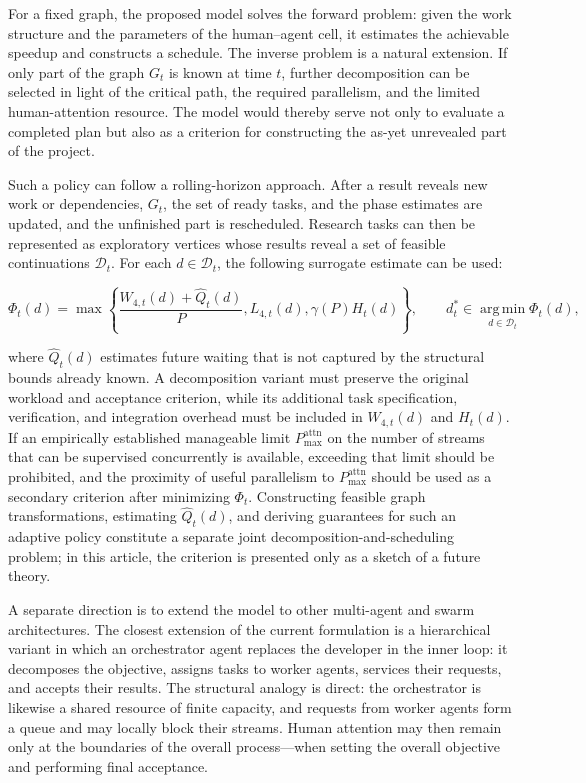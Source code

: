 For a fixed graph, the proposed model solves the forward problem: given the
work structure and the parameters of the human--agent cell, it estimates the
achievable speedup and constructs a schedule. The inverse problem is a natural
extension. If only part of the graph $G_t$ is known at time $t$, further
decomposition can be selected in light of the critical path, the required
parallelism, and the limited human-attention resource. The model would thereby
serve not only to evaluate a completed plan but also as a criterion for
constructing the as-yet unrevealed part of the project.

Such a policy can follow a rolling-horizon approach. After a result reveals
new work or dependencies, $G_t$, the set of ready tasks, and the phase
estimates are updated, and the unfinished part is rescheduled. Research tasks
can then be represented as exploratory vertices whose results reveal a set of
feasible continuations $\mathcal D_t$. For each $d\in\mathcal D_t$, the
following surrogate estimate can be used:

\[
\Phi_t(d)=
\max\left\{
\frac{W_{4,t}(d)+\widehat Q_t(d)}{P},
L_{4,t}(d),
\gamma(P)H_t(d)
\right\},
\qquad
d_t^*\in\operatorname*{arg\,min}_{d\in\mathcal D_t}\Phi_t(d),
\]

where $\widehat Q_t(d)$ estimates future waiting that is not captured by the
structural bounds already known. A decomposition variant must preserve the
original workload and acceptance criterion, while its additional task
specification, verification, and integration overhead must be included in
$W_{4,t}(d)$ and $H_t(d)$. If an empirically established manageable limit
$P_{\max}^{\mathrm{attn}}$ on the number of streams that can be supervised
concurrently is available, exceeding that limit should be prohibited,
and the proximity of useful parallelism to $P_{\max}^{\mathrm{attn}}$ should
be used as a secondary criterion after minimizing $\Phi_t$. Constructing
feasible graph transformations, estimating $\widehat Q_t(d)$, and deriving
guarantees for such an adaptive policy constitute a separate joint
decomposition-and-scheduling problem; in this article, the criterion is
presented only as a sketch of a future theory.

A separate direction is to extend the model to other multi-agent and swarm
architectures. The closest extension of the current formulation is a
hierarchical variant in which an orchestrator agent replaces the developer in
the inner loop: it decomposes the objective, assigns tasks to worker agents,
services their requests, and accepts their results. The structural analogy is
direct: the orchestrator is likewise a shared resource of finite capacity, and
requests from worker agents form a queue and may locally block their streams.
Human attention may then remain only at the boundaries of the overall
process---when setting the overall objective and performing final acceptance.

